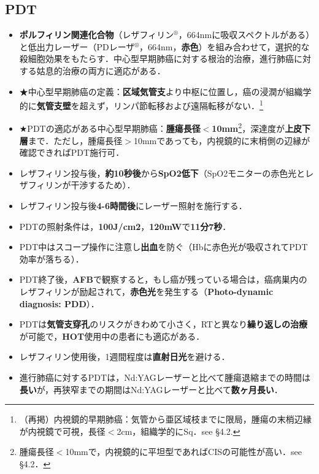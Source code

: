 \subsection{PDT}
\begin{itemize}

\item \textbf{ポルフィリン関連化合物}（レザフィリン$^{\circledR}$，664nmに吸収スペクトルがある）と低出力レーザー（PDレーザ$^{\circledR}$，664nm，\textbf{赤色}）を組み合わせて，選択的な殺細胞効果をもたらす．中心型早期肺癌に対する根治的治療，進行肺癌に対する姑息的治療の両方に適応がある．

\item ★中心型早期肺癌の定義：\textbf{区域気管支}より中枢に位置し，癌の浸潤が組織学的に\textbf{気管支壁}を超えず，リンパ節転移および遠隔転移がない．\footnote{ （再掲）内視鏡的早期肺癌：{気管から亜区域枝}までに限局，{腫瘍の末梢辺縁が内視鏡で可視}，{長径$<$2cm}，{組織学的にSq}．see \S 4.2.
}
\item ★PDTの適応がある中心型早期肺癌：\textbf{腫瘍長径$<$10mm}\footnote{腫瘍長径$<$10mmで，内視鏡的に平坦型であればCISの可能性が高い．see \S 4.2．}，深達度が\textbf{上皮下層}まで．ただし，腫瘍長径$>$10mmであっても，内視鏡的に末梢側の辺縁が確認できればPDT施行可．
\item レザフィリン投与後，\textbf{約10秒後}から\textbf{SpO2低下}（SpO2モニターの赤色光とレザフィリンが干渉するため）．

\item レザフィリン投与後\textbf{4-6時間後}にレーザー照射を施行する．
\item PDTの照射条件は，\textbf{100J/cm2}，\textbf{120mW}で\textbf{11分7秒}．
\item PDT中はスコープ操作に注意し\textbf{出血}を防ぐ（Hbに赤色光が吸収されてPDT効率が落ちる）．
\item PDT終了後，\textbf{AFB}で観察すると，もし癌が残っている場合は，癌病巣内のレザフィリンが励起されて，\textbf{赤色光}を発生する（\textbf{Photo-dynamic diagnosis: PDD}）．
\item PDTは\textbf{気管支穿孔}のリスクがきわめて小さく，RTと異なり\textbf{繰り返しの治療}が可能で，\textbf{HOT}使用中の患者にも適応がある．
\item レザフィリン使用後，1週間程度は\textbf{直射日光}を避ける．
\item 進行肺癌に対するPDTは，Nd:YAGレーザーと比べて腫瘍退縮までの時間は\textbf{長い}が，再狭窄までの期間はNd:YAGレーザーと比べて\textbf{数ヶ月長い}．


\end{itemize}

